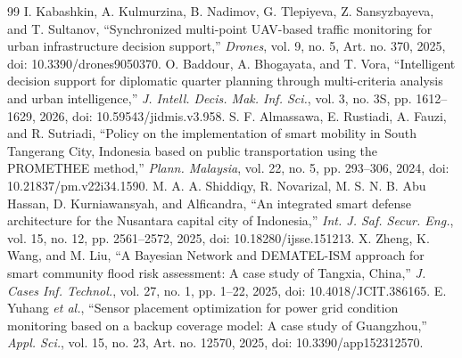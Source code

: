 \documentclass[10pt,twocolumn,a4paper]{article}
\begin{document}
\begin{thebibliography}{99}
 I. Kabashkin, A. Kulmurzina, B. Nadimov, G. Tlepiyeva, Z. Sansyzbayeva, and T. Sultanov, ``Synchronized multi-point UAV-based traffic monitoring for urban infrastructure decision support,'' \textit{Drones}, vol. 9, no. 5, Art. no. 370, 2025, doi: 10.3390/drones9050370.
 O. Baddour, A. Bhogayata, and T. Vora, ``Intelligent decision support for diplomatic quarter planning through multi-criteria analysis and urban intelligence,'' \textit{J. Intell. Decis. Mak. Inf. Sci.}, vol. 3, no. 3S, pp. 1612--1629, 2026, doi: 10.59543/jidmis.v3.958.
 S. F. Almassawa, E. Rustiadi, A. Fauzi, and R. Sutriadi, ``Policy on the implementation of smart mobility in South Tangerang City, Indonesia based on public transportation using the PROMETHEE method,'' \textit{Plann. Malaysia}, vol. 22, no. 5, pp. 293--306, 2024, doi: 10.21837/pm.v22i34.1590.
 M. A. A. Shiddiqy, R. Novarizal, M. S. N. B. Abu Hassan, D. Kurniawansyah, and Alficandra, ``An integrated smart defense architecture for the Nusantara capital city of Indonesia,'' \textit{Int. J. Saf. Secur. Eng.}, vol. 15, no. 12, pp. 2561--2572, 2025, doi: 10.18280/ijsse.151213.
 X. Zheng, K. Wang, and M. Liu, ``A Bayesian Network and DEMATEL-ISM approach for smart community flood risk assessment: A case study of Tangxia, China,'' \textit{J. Cases Inf. Technol.}, vol. 27, no. 1, pp. 1--22, 2025, doi: 10.4018/JCIT.386165.
 E. Yuhang \textit{et al.}, ``Sensor placement optimization for power grid condition monitoring based on a backup coverage model: A case study of Guangzhou,'' \textit{Appl. Sci.}, vol. 15, no. 23, Art. no. 12570, 2025, doi: 10.3390/app152312570.
\end{thebibliography}
\end{document}
